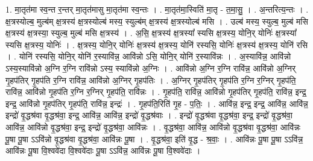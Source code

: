\documentclass[17pt]{extarticle}
\begin{document}
1. मा॒तृत॑मा स्व॒न्त र॒न्तर् मा॒तृत॑मासु मा॒तृत॑मा स्व॒न्तः । . मा॒तृत॑मा॒स्विति॑ मा॒तृ - त॒मा॒सु॒ । . अ॒न्तरित्य॒न्तः । . क्ष॒त्रस्योल्ब॒ मुल्ब॑म् क्ष॒त्रस्य॑ क्ष॒त्रस्योल्ब॑ मस्य॒ स्युल्ब॑म् क्ष॒त्रस्य॑ क्ष॒त्रस्योल्ब॑ मसि । . उल्ब॑ मस्य॒ स्युल्ब॒ मुल्ब॑ मसि क्ष॒त्रस्य॑ क्ष॒त्रस्या॒ स्युल्ब॒ मुल्ब॑ मसि क्ष॒त्रस्य॑ । . अ॒सि॒ क्ष॒त्रस्य॑ क्ष॒त्रस्या᳚ स्यसि क्ष॒त्रस्य॒ योनि॒र् योनिः॑ क्ष॒त्रस्या᳚ स्यसि क्ष॒त्रस्य॒ योनिः॑ । . क्ष॒त्रस्य॒ योनि॒र् योनिः॑ क्ष॒त्रस्य॑ क्ष॒त्रस्य॒ योनि॑ रस्यसि॒ योनिः॑ क्ष॒त्रस्य॑ क्ष॒त्रस्य॒ योनि॑ रसि । . योनि॑ रस्यसि॒ योनि॒र् योनि॑ र॒स्यावि॑न्न॒ आवि॑न्नो ऽसि॒ योनि॒र् योनि॑ र॒स्यावि॑न्नः । . अ॒स्यावि॑न्न॒ आवि॑न्नो ऽस्य॒स्यावि॑न्नो अ॒ग्नि र॒ग्नि रावि॑न्नो ऽस्य॒ स्यावि॑न्नो अ॒ग्निः । . आवि॑न्नो अ॒ग्नि र॒ग्नि रावि॑न्न॒ आवि॑न्नो अ॒ग्निर् गृ॒हप॑तिर् गृ॒हप॑ति र॒ग्नि रावि॑न्न॒ आवि॑न्नो अ॒ग्निर् गृ॒हप॑तिः । . अ॒ग्निर् गृ॒हप॑तिर् गृ॒हप॑ति र॒ग्नि र॒ग्निर् गृ॒हप॑ति॒ रावि॑न्न॒ आवि॑न्नो गृ॒हप॑ति र॒ग्नि र॒ग्निर् गृ॒हप॑ति॒ रावि॑न्नः । . गृ॒हप॑ति॒ रावि॑न्न॒ आवि॑न्नो गृ॒हप॑तिर् गृ॒हप॑ति॒ रावि॑न्न॒ इन्द्र॒ इन्द्र॒ आवि॑न्नो गृ॒हप॑तिर् गृ॒हप॑ति॒ रावि॑न्न॒ इन्द्रः॑ । . गृ॒हप॑ति॒रिति॑ गृ॒ह - प॒तिः॒ । . आवि॑न्न॒ इन्द्र॒ इन्द्र॒ आवि॑न्न॒ आवि॑न्न॒ इन्द्रो॑ वृ॒द्धश्र॑वा वृ॒द्धश्र॑वा॒ इन्द्र॒ आवि॑न्न॒ आवि॑न्न॒ इन्द्रो॑ वृ॒द्धश्र॑वाः । . इन्द्रो॑ वृ॒द्धश्र॑वा वृ॒द्धश्र॑वा॒ इन्द्र॒ इन्द्रो॑ वृ॒द्धश्र॑वा॒ आवि॑न्न॒ आवि॑न्नो वृ॒द्धश्र॑वा॒ इन्द्र॒ इन्द्रो॑ वृ॒द्धश्र॑वा॒ आवि॑न्नः । . वृ॒द्धश्र॑वा॒ आवि॑न्न॒ आवि॑न्नो वृ॒द्धश्र॑वा वृ॒द्धश्र॑वा॒ आवि॑न्नः पू॒षा पू॒षा ऽऽवि॑न्नो वृ॒द्धश्र॑वा वृ॒द्धश्र॑वा॒ आवि॑न्नः पू॒षा । . वृ॒द्धश्र॑वा॒ इति॑ वृ॒द्ध - श्र॒वाः॒ । . आवि॑न्नः पू॒षा पू॒षा ऽऽवि॑न्न॒ आवि॑न्नः पू॒षा वि॒श्ववे॑दा वि॒श्ववे॑दाः पू॒षा ऽऽवि॑न्न॒ आवि॑न्नः पू॒षा वि॒श्ववे॑दाः । \newline
\end{document}
